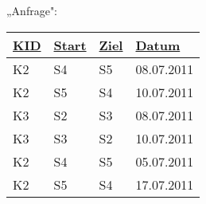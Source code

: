 \documentclass{lehramt-informatik-minimal}
\def\TmpUeber#1{{\setul{-0.9em}{}\ul{#1}}}
\begin{document}
{\begin{multicols}{2}
„Anfrage":

\begin{tabular}{|l|l|l|l|}
\hline
\ul{KID} & \TmpUeber{Start} & \TmpUeber{Ziel} & \ul{Datum}\\\hline\hline
K2 & S4 & S5 & 08.07.2011\\\hline
K2 & S5 & S4 & 10.07.2011\\\hline
K3 & S2 & S3 & 08.07.2011\\\hline
K3 & S3 & S2 & 10.07.2011\\\hline
K2 & S4 & S5 & 05.07.2011\\\hline
K2 & S5 & S4 & 17.07.2011\\\hline
\end{tabular}
\end{multicols}
}

\renewcommand{\labelenumi}{\arabic{enumi}.}
\end{document}
